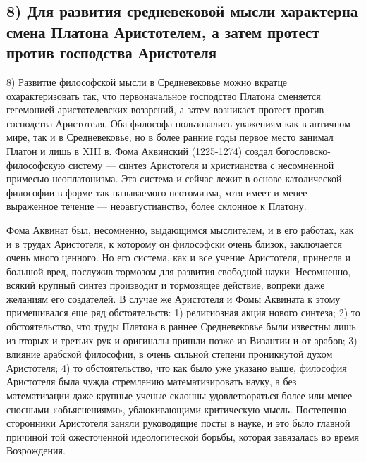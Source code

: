 \subsection{8) Для развития средневековой мысли характерна смена
Платона Аристотелем, а затем протест против господства Аристотеля}

8) Развитие философской мысли в Средневековье можно вкратце
охарактеризовать так, что первоначальное господство Платона сменяется
гегемонией аристотелевских воззрений, а затем возникает протест против
господства Аристотеля. Оба философа пользовались уважениям как в
античном мире, так и в Средневековье, но в более ранние годы первое
место занимал Платон и лишь в XIII в. Фома Аквинский (1225-1274)
создал богословско-философскую систему --- синтез Аристотеля и
христианства с несомненной примесью неоплатонизма. Эта система и
сейчас лежит в основе католической философии в форме так называемого
неотомизма, хотя имеет и менее выраженное течение ---
неоавгустианство, более склонное к Платону.

Фома Аквинат был, несомненно, выдающимся мыслителем, и в его работах,
как и в трудах Аристотеля, к которому он философски очень близок,
заключается очень много ценного. Но его система, как и все учение
Аристотеля, принесла и большой вред, послужив тормозом для развития
свободной науки. Несомненно, всякий крупный синтез производит и
тормозящее действие, вопреки даже желаниям его создателей. В случае же
Аристотеля и Фомы Аквината к этому примешивался еще ряд обстоятельств:
1) религиозная акция нового синтеза; 2) то обстоятельство, что труды
Платона в раннее Средневековье были известны лишь из вторых и третьих
рук и оригиналы пришли позже из Византии и от арабов; 3) влияние
арабской философии, в очень сильной степени проникнутой духом
Аристотеля; 4) то обстоятельство, что как было уже указано выше,
философия Аристотеля была чужда стремлению математизировать науку, а
без математизации даже крупные ученые склонны удовлетворяться более
или менее сносными «объяснениями», убаюкивающими критическую мысль.
Постепенно сторонники Аристотеля заняли руководящие посты в науке, и
это было главной причиной той ожесточенной идеологической борьбы,
которая завязалась во время Возрождения.

